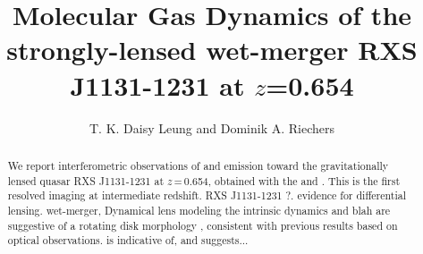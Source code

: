 \documentclass[]{emulateapj}
\begin{document}

\title{Molecular Gas Dynamics of the strongly-lensed wet-merger RXS J1131-1231 at $z$=0.654}
\author{T. K. Daisy Leung and Dominik A. Riechers}


\begin{abstract}
We report interferometric observations of \bco and \cco emission toward the gravitationally lensed 
quasar RXS J1131-1231 at $z$\,=\,0.654, obtained with the \pdbi and \carma. 
This is the first resolved \bco imaging at intermediate redshift.
RXS J1131-1231 ?. 
evidence for differential lensing.
wet-merger, Dynamical lens modeling
the intrinsic dynamics and blah are suggestive of a rotating disk morphology , consistent with previous results based on optical observations.
is indicative of, and suggests...
\end{abstract}


\end{document}
